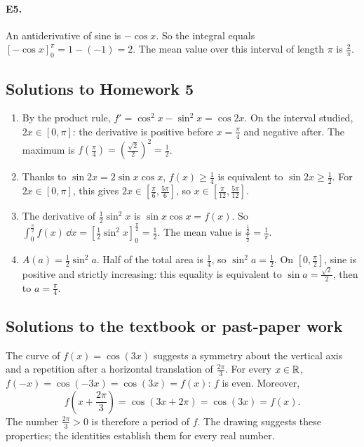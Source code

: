 \paragraph{E5.}An antiderivative of sine is $-\cos x$. So the integral equals $[-\cos x]_0^\pi=1-(-1)=2$. The mean value over this interval of length $\pi$ is $\frac{2}{\pi}$.

\subsection{Solutions to Homework 5}\begin{enumerate}
\item By the product rule, $f'=\cos^2x-\sin^2x=\cos2x$. On the interval studied, $2x\in[0,\pi]$: the derivative is positive before $x=\frac{\pi}{4}$ and negative after. The maximum is $f(\frac{\pi}{4})=(\frac{\sqrt{2}}{2})^2=\frac{1}{2}$.
\item Thanks to $\sin2x=2\sin x\cos x$, $f(x)\ge\frac{1}{4}$ is equivalent to $\sin 2x\ge\frac{1}{2}$. For $2x\in[0,\pi]$, this gives $2x\in[\frac{\pi}{6},\frac{5\pi}{6}]$, so $x\in[\frac{\pi}{12},\frac{5\pi}{12}]$.
\item The derivative of $\frac12\sin^2x$ is $\sin x\cos x=f(x)$. So $\int_0^{\frac{\pi}{2}}f(x)\,\dd x=[\frac12\sin^2x]_0^{\frac{\pi}{2}}=\frac{1}{2}$. The mean value is $\frac{\frac{1}{2}}{\frac{\pi}{2}}=\frac{1}{\pi}$.
\item $A(a)=\frac12\sin^2a$. Half of the total area is $\frac{1}{4}$, so $\sin^2a=\frac{1}{2}$. On $[0,\frac{\pi}{2}]$, sine is positive and strictly increasing: this equality is equivalent to $\sin a=\frac{\sqrt{2}}{2}$, then to $a=\frac{\pi}{4}$.
\end{enumerate}

\subsection{Solutions to the textbook or past-paper work}The curve of $f(x)=\cos(3x)$ suggests a symmetry about the vertical axis and a repetition after a horizontal translation of $\frac{2\pi}3$. For every $x\in\mathbb R$, $f(-x)=\cos(-3x)=\cos(3x)=f(x)$: $f$ is even. Moreover,
\[f\left(x+\frac{2\pi}3\right)=\cos(3x+2\pi)=\cos(3x)=f(x).\]
The number $\frac{2\pi}3>0$ is therefore a period of $f$. The drawing suggests these properties; the identities establish them for every real number.

\fi

\backmatter
